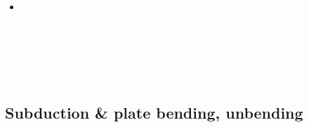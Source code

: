 \begin{scriptsize}
\begin{itemize}
\textcite{befd21} \\
\textcite{chcg21} \\
\textcite{kifc21} \\
\textcite{zhle21} \\
\textcite{bafu21} \\
\textcite{kekg21} \\
\textcite{enma21} \\
\textcite{hoco21} \\
\textcite{resr21} \\
\textcite{gupg21b} \\
\textcite{ligl21b} \\
\textcite{gebb21} \\
\textcite{brbf21} \\
\textcite{chri21} \\
\textcite{diha21} \\
\item[\twothousandtwentytwo] 
\textcite{scva22} \\
\textcite{alrr22a} \\
\textcite{alrr22b} \\
\textcite{behb22} \\
\textcite{erhf22} \\
\textcite{yacz22} \\

\end{itemize}
\end{scriptsize}

\subsection{Subduction \& plate bending, unbending}

